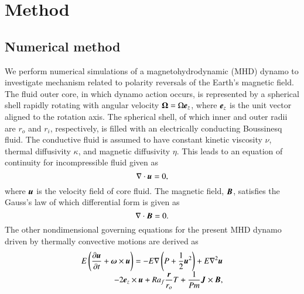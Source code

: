 \section{Method}
\label{section:method}

\subsection{Numerical method}

We perform numerical simulations of a magnetohydrodynamic (MHD) dynamo to investigate  mechanism related to polarity reversals of the Earth's magnetic field.
The fluid outer core, in which dynamo action occurs, is represented by a spherical shell rapidly rotating with angular velocity ${\bf \Omega} = \Omega \mbox{\boldmath$e$}_z$, where $\mbox{\boldmath$e$}_z$ is the unit vector aligned to the rotation axis.
The spherical shell, of which inner and outer radii are $r_o$ and $r_i$, respectively, is filled with an electrically conducting Boussinesq fluid. 
{\color{blue}
The conductive fluid is assumed to have constant kinetic viscosity $\nu$, thermal diffusivity $\kappa$, and magnetic diffusivity $\eta$.
}
This leads to an equation of continuity for incompressible fluid given as
%
\begin{equation}
\nabla \cdot \mbox{\boldmath$u$} = 0,
\label{eq:divu=0}
\end{equation}
%
where $\mbox{\boldmath$u$}$ is the velocity field of core fluid.
The magnetic field, $\mbox{\boldmath$B$}$, satisfies the Gauss's law of which differential form is given as
%
\begin{equation}
\nabla \cdot \mbox{\boldmath$B$} = 0.
\label{eq:divB=0}
\end{equation}
%
The other nondimensional governing equations for the present MHD dynamo driven by thermally convective motions are derived as
%
\begin{equation}
\begin{array}{l}
\displaystyle
E \left( \frac{\partial\bvec{u}}{\partial t} +
 \bvec{\omega} \times \bvec{u} \right) =
 - E \nabla \left( P + \frac{1}{2} \bvec{u}^2 \right)
 + E \nabla^2 \bvec{u}
\\
\displaystyle
\hspace*{\fill}
 -2 \bvec{e}_z \times \bvec{u}
 + Ra_f \frac{\bvec{r}}{r_o} T
 + \frac{1}{Pm} \bvec{J} \times \bvec{B} ,
\end{array}
\label{eq:momentum}
\end{equation}
